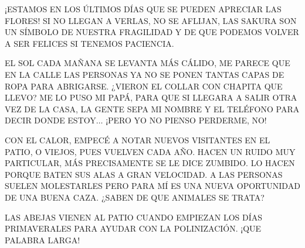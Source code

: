 \newpage
{}
\newpage
{}
¡ESTAMOS EN LOS ÚLTIMOS DÍAS QUE SE PUEDEN APRECIAR LAS FLORES! SI NO LLEGAN A VERLAS, NO SE AFLIJAN, LAS SAKURA SON UN SÍMBOLO DE NUESTRA FRAGILIDAD Y DE QUE PODEMOS VOLVER A SER FELICES SI TENEMOS PACIENCIA.	



\newpage
{}
EL SOL CADA MAÑANA SE LEVANTA MÁS CÁLIDO, ME PARECE QUE EN LA CALLE   LAS PERSONAS YA NO SE PONEN TANTAS CAPAS DE ROPA PARA ABRIGARSE. ¿VIERON EL  COLLAR CON CHAPITA		QUE LLEVO? ME LO PUSO MI PAPÁ, PARA QUE SI LLEGARA A SALIR OTRA VEZ DE LA CASA, LA GENTE SEPA MI NOMBRE Y EL TELÉFONO PARA DECIR DONDE ESTOY$\ldots$ ¡PERO YO NO PIENSO PERDERME, NO!

CON EL CALOR, EMPECÉ A NOTAR NUEVOS VISITANTES EN EL PATIO, O VIEJOS, PUES VUELVEN CADA AÑO. HACEN UN RUIDO MUY PARTICULAR, MÁS PRECISAMENTE SE LE DICE ZUMBIDO. LO HACEN PORQUE BATEN SUS ALAS A GRAN VELOCIDAD. A LAS PERSONAS SUELEN MOLESTARLES PERO PARA MÍ ES UNA NUEVA OPORTUNIDAD DE UNA BUENA CAZA. ¿SABEN DE QUE ANIMALES SE TRATA?




\newpage
{}
LAS ABEJAS VIENEN AL PATIO CUANDO EMPIEZAN LOS DÍAS PRIMAVERALES PARA AYUDAR CON LA POLINIZACIÓN. ¡QUE PALABRA LARGA!

